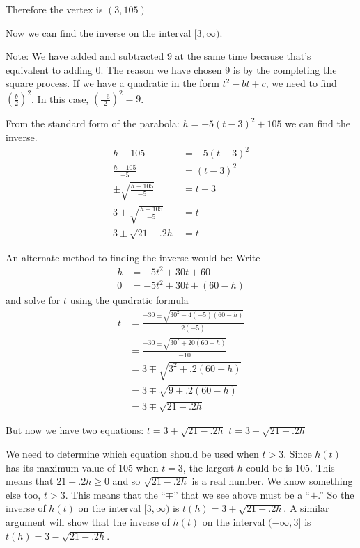 \documentclass{ximera}
\begin{document}
\begin{example}
\begin{explanation}
Therefore the vertex is $(3,105)$

Now we can find the inverse on the interval $[3,\infty)$.

Note: We have added and subtracted $9$ at the same time because that's
equivalent to adding $0$.  The reason we have chosen 9 is by the
completing the square process.  If we have a quadratic in the form
$t^2-bt+c$, we need to find $(\frac {b}{2})^2$.  In this case,
$(\frac{-6}{2})^2 =9$.

From the standard form of the parabola: $h = -5(t-3)^2+105$ we can find the inverse.
\begin{align*}
h-105 &= -5(t-3)^2\\
\frac {h-105}{-5} &= (t-3)^2\\
\pm \sqrt{\frac {h-105}{-5}} &=t-3\\
3 \pm \sqrt{\frac {h-105}{-5}} &=t\\
3 \pm \sqrt{21-.2h} &=t 
\end{align*}

An alternate method to finding the inverse would be: 
Write
\begin{align*}
h &=  -5 t^2 +30t+60\\
0 &= -5 t^2 +30t+(60 - h)
\end{align*}
and solve for $t$ using the quadratic formula
\begin{align*}
t &= \frac{-30\pm \sqrt{30^2 -4(-5)(60-h)}}{2(-5)}\\
&= \frac{-30\pm \sqrt{30^2 +20(60-h)}}{-10}\\
&=3\mp \sqrt{3^2+ .2(60-h)}\\
&=3\mp \sqrt{9+ .2(60-h)}\\
&=3\mp \sqrt{21-.2h}
\end{align*}

But now we have two equations:
$t=3+ \sqrt{21-.2h}$
$t=3- \sqrt{21-.2h}$

We need to determine which equation should be used when $t>3$.
 Since $h(t)$ has its maximum value
  of $105$ when $t=3$, the largest $h$ could be is $105$. This means
  that $21-.2h \ge 0$ and so $\sqrt{21-.2h}$ is a real number. We know
  something else too, $t>3$. This means that the ``$\mp$'' that we see
  above must be a ``$+$.''  So the inverse of $h(t)$ on the interval
  $[3,\infty)$ is $t(h) = 3+ \sqrt{21-.2h}$. A similar argument will
    show that the inverse of $h(t)$ on the interval $(-\infty, 3]$ is
  $t(h) = 3- \sqrt{21-.2h}$.
\end{explanation}
\end{example}
\end{document}
